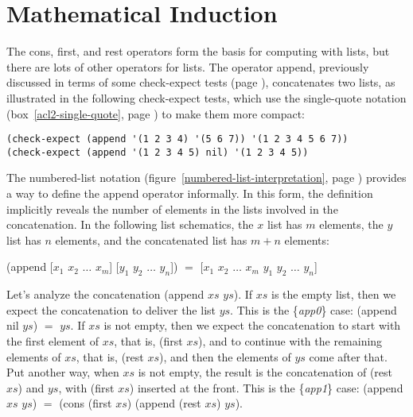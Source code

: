 \begin{exercises}


\end{exercises}

\section{Mathematical Induction}
\label{sec:induction}
The \textsf{cons}, \textsf{first}, and \textsf{rest} operators
form the basis for computing with lists,
but there are lots of other operators for lists.
The operator \textsf{append}, previously discussed in terms of some \textsf{check-expect} tests
(page \pageref{append-op-informal}), concatenates two lists, as illustrated
in the following \textsf{check-expect} tests,
which use the single-quote notation (box~\ref{acl2-single-quote}, page \pageref{acl2-single-quote})
to make them more compact:

\begin{code}
\begin{verbatim}
(check-expect (append '(1 2 3 4) '(5 6 7)) '(1 2 3 4 5 6 7))
(check-expect (append '(1 2 3 4 5) nil) '(1 2 3 4 5))
\end{verbatim}
\end{code}

The numbered-list notation
(figure~\ref{numbered-list-interpretation}, page \pageref{numbered-list-interpretation})
provides a way to define the \textsf{append} operator informally.
In this form, the definition implicitly reveals the number of elements in the lists
involved in the concatenation.
\label{list-schematic} In the following list schematics,
the $x$ list has $m$ elements, the $y$ list has $n$ elements,
and the concatenated list has $m+n$ elements:
\begin{samepage}
\begin{center}
\textsf{(append [$x_1$ $x_2$ $\dots$ $x_m$] [$y_1$ $y_2$ $\dots$ $y_n$])} $=$
\textsf{[$x_1$ $x_2$ $\dots$ $x_m$ $y_1$ $y_2$ $\dots$ $y_n$]}
\end{center}
\end{samepage}

Let's analyze the concatenation \textsf{(append $xs$ $ys$)}. %
If $xs$ is the empty list, then we expect
the concatenation to deliver the list $ys$.
This is the  \{\emph{app0}\} case: \textsf{(append nil $ys$)} $=$ $ys$.
If $xs$ is not empty, then we expect the concatenation
to start with the first element of $xs$,
that is, \textsf{(first $xs$)}, and to continue
with the remaining elements of $xs$, that is, \textsf{(rest $xs$)},
and then the elements of $ys$ come after that.
Put another way, when $xs$ is not empty,
the result is the concatenation of \textsf{(rest $xs$)} and $ys$,
with \textsf{(first $xs$)} inserted at the front.
This is the \{\emph{app1}\} case: \textsf{(append $xs$ $ys$)} $=$
\textsf{(cons (first $xs$) (append (rest $xs$) $ys$)}.

